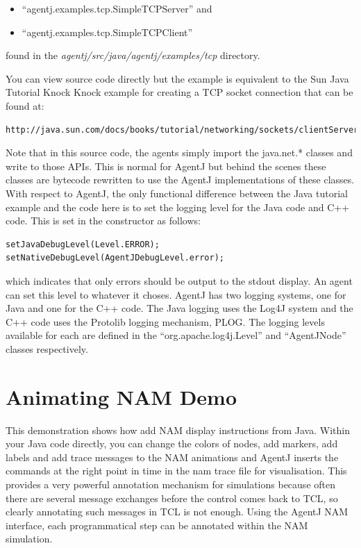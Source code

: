 \begin{itemize}
\item ``agentj.examples.tcp.SimpleTCPServer'' and 
\item ``agentj.examples.tcp.SimpleTCPClient'' 
\end{itemize}
\noindent found in the \emph{agentj/src/java/agentj/examples/tcp} directory. 

You can view source code directly but the example is equivalent to the Sun Java Tutorial  Knock Knock example for creating a TCP socket connection that can be found at:

\footnotesize
\begin{verbatim}
http://java.sun.com/docs/books/tutorial/networking/sockets/clientServer.html
 \end{verbatim}
 \normalsize
 
Note that in this source code, the agents simply import the java.net.* classes and write to those APIs.  This is normal for AgentJ but behind the scenes these classes are bytecode rewritten to use the AgentJ implementations of these classes.  With respect to AgentJ, the only functional difference between the Java tutorial example and the code here is to set the logging level for the Java code and C++ code. This is set in the constructor as follows: 
 
 \footnotesize
 \begin{verbatim}
setJavaDebugLevel(Level.ERROR);
setNativeDebugLevel(AgentJDebugLevel.error);        
 \end{verbatim}
 \normalsize

\noindent which indicates that only errors should be output to the stdout display.  An agent can set this level to whatever it choses.  \sloppypar AgentJ has two logging systems, one for Java and one for the C++ code.  The Java logging uses the Log4J system \cite{log4j} and the C++ code uses the Protolib logging mechanism, PLOG.     The logging levels available for each are defined in the ``org.apache.log4j.Level'' and ``AgentJNode'' classes respectively.
 

 \section{Animating NAM Demo}
 \label{sec:namdemo}
 

This demonstration shows how add NAM display instructions from Java.  Within your Java code directly, you can change the colors of nodes, add markers, add labels and add trace messages to the NAM animations and AgentJ inserts the commands at the right point in time in the nam trace file for visualisation. This provides a very powerful annotation mechanism for simulations because often there are several message exchanges before the control comes back to TCL, so clearly annotating such messages in TCL is not enough.
Using the AgentJ NAM interface, each programmatical step can be annotated within the NAM simulation.

